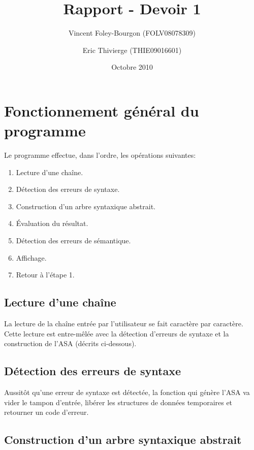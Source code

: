 \documentclass[10pt]{report}
\begin{document}
\title{Rapport - Devoir 1}
\date{Octobre 2010}
\author{Vincent Foley-Bourgon (FOLV08078309) \and
  Eric Thivierge (THIE09016601)}

\maketitle

\section{Fonctionnement général du programme}

Le programme effectue, dans l'ordre, les opérations suivantes:

\begin{enumerate}
  \item Lecture d'une chaîne.
  \item Détection des erreurs de syntaxe.
  \item Construction d'un arbre syntaxique abstrait.
  \item Évaluation du résultat.
  \item Détection des erreurs de sémantique.
  \item Affichage.
  \item Retour à l'étape 1.
\end{enumerate}


\subsection{Lecture d'une chaîne}

La lecture de la chaîne entrée par l'utilisateur se fait caractère par
caractère.  Cette lecture est entre-mêlée avec la détection d'erreurs
de syntaxe et la construction de l'ASA (décrits ci-dessous).

\subsection{Détection des erreurs de syntaxe}

Aussitôt qu'une erreur de syntaxe est détectée, la fonction qui génère
l'ASA va vider le tampon d'entrée, libérer les structures de données
temporaires et retourner un code d'erreur.

\subsection{Construction d'un arbre syntaxique abstrait}
\end{document}
